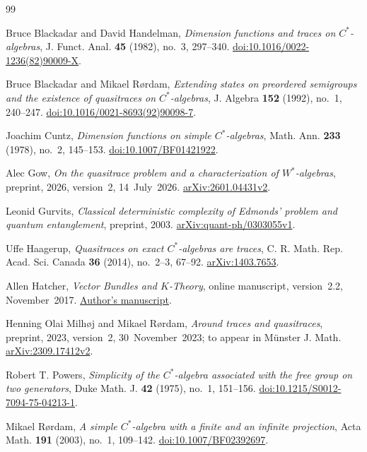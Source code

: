 \begin{thebibliography}{99}

Bruce Blackadar and David Handelman,
\emph{Dimension functions and traces on $C^*$-algebras},
J. Funct. Anal. \textbf{45} (1982), no.~3, 297--340.
\href{https://doi.org/10.1016/0022-1236(82)90009-X}
{doi:10.1016/0022-1236(82)90009-X}.

Bruce Blackadar and Mikael R{\o}rdam,
\emph{Extending states on preordered semigroups and the existence of
quasitraces on $C^*$-algebras},
J. Algebra \textbf{152} (1992), no.~1, 240--247.
\href{https://doi.org/10.1016/0021-8693(92)90098-7}
{doi:10.1016/0021-8693(92)90098-7}.

Joachim Cuntz,
\emph{Dimension functions on simple $C^*$-algebras},
Math. Ann. \textbf{233} (1978), no.~2, 145--153.
\href{https://doi.org/10.1007/BF01421922}{doi:10.1007/BF01421922}.

Alec Gow,
\emph{On the quasitrace problem and a characterization of $W^*$-algebras},
preprint, 2026, version~2, 14~July~2026.
\href{https://arxiv.org/abs/2601.04431v2}{arXiv:2601.04431v2}.

Leonid Gurvits,
\emph{Classical deterministic complexity of Edmonds' problem and quantum entanglement},
preprint, 2003.
\href{https://arxiv.org/abs/quant-ph/0303055v1}{arXiv:quant-ph/0303055v1}.

Uffe Haagerup,
\emph{Quasitraces on exact $C^*$-algebras are traces},
C. R. Math. Rep. Acad. Sci. Canada \textbf{36} (2014), no.~2--3, 67--92.
\href{https://arxiv.org/abs/1403.7653}{arXiv:1403.7653}.

Allen Hatcher,
\emph{Vector Bundles and $K$-Theory},
online manuscript, version~2.2, November~2017.
\href{https://pi.math.cornell.edu/~hatcher/VBKT/VB.pdf}
{Author's manuscript}.

Henning Olai Milh{\o}j and Mikael R{\o}rdam,
\emph{Around traces and quasitraces},
preprint, 2023, version~2, 30~November~2023;
to appear in M\"unster J. Math.
\href{https://arxiv.org/abs/2309.17412v2}{arXiv:2309.17412v2}.

Robert T. Powers,
\emph{Simplicity of the $C^*$-algebra associated with the free group on
two generators},
Duke Math. J. \textbf{42} (1975), no.~1, 151--156.
\href{https://doi.org/10.1215/S0012-7094-75-04213-1}
{\mbox{doi:10.1215/S0012-7094-75-04213-1}}.

Mikael R{\o}rdam,
\emph{A simple $C^*$-algebra with a finite and an infinite projection},
Acta Math. \textbf{191} (2003), no.~1, 109--142.
\href{https://doi.org/10.1007/BF02392697}{doi:10.1007/BF02392697}.


\end{thebibliography}
